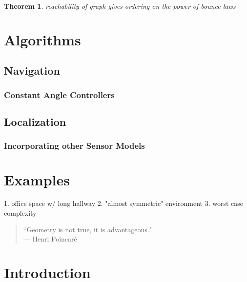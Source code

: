 \documentclass[]{article}  %
\newtheorem{theorem}{\bf Theorem}
\begin{document}
\begin{theorem}
reachability of graph gives ordering on the power of bounce laws
\end{theorem}

\section{Algorithms}

\subsection{Navigation}

\subsubsection{Constant Angle Controllers}

\subsection{Localization}

\subsubsection{Incorporating other Sensor Models}

\section{Examples}

1. office space w/ long hallway
2. "almost symmetric" environment
3. worst case complexity

\iffalse

{\small
\begin{center}
\begin{quotation}
``Geometry is not true, it is advantageous." \\
\hfill    --- Henri Poincar\'e
\end{quotation}
\end{center}
}


\section{Introduction} 
\end{document}
